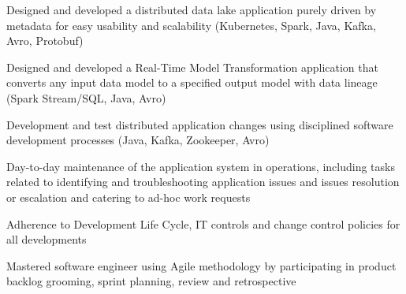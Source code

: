 \documentclass[]{main}
\begin{document}
\begin{minipage}[t]{0.73\textwidth}
\begin{tightemize}
\end{tightemize}
\sectionsep



\begin{tightemize}
\item Designed and developed a distributed data lake application purely driven by metadata for easy usability and scalability (Kubernetes, Spark, Java, Kafka, Avro, Protobuf)
\item Designed and developed a Real-Time Model Transformation application that converts any input data model to a specified output model with data lineage (Spark Stream/SQL, Java, Avro) 
\item Development and test distributed application changes using disciplined software development processes (Java, Kafka, Zookeeper, Avro)
\item Day-to-day maintenance of the application system in operations, including tasks related to identifying and troubleshooting application issues and issues resolution or escalation and catering to ad-hoc work requests
\item Adherence to Development Life Cycle, IT controls and change control policies for all developments
\item Mastered software engineer using Agile methodology by participating in product backlog grooming, sprint planning, review and retrospective
\end{tightemize}
\sectionsep

\end{minipage} 
\end{document}
